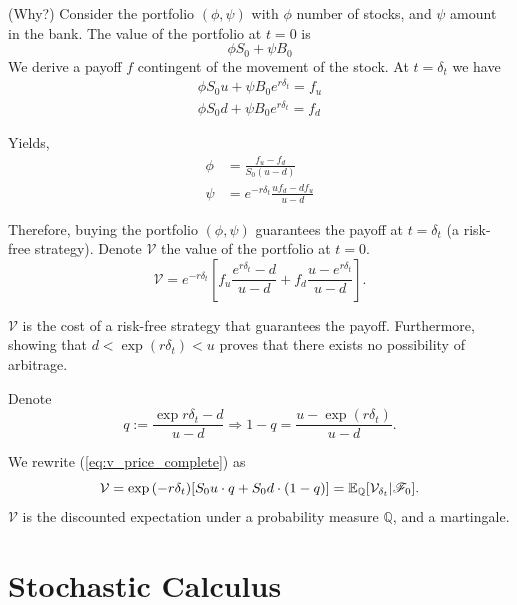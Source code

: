 \documentclass{beamer}
\begin{document}
\begin{frame}
(Why?)
Consider the portfolio $(\phi, \psi)$ with $\phi$ number of stocks, and $\psi$ amount in the bank. The value of the portfolio at $t=0$ is
\[
    \phi S_0 + \psi B_0
\]
We derive a payoff $f$ contingent of the movement of the stock. At $t=\delta_t$ we have
\begin{align*}
    \phi S_0u + \psi B_0e^{r \delta_t} = f_u\\
    \phi S_0d + \psi B_0e^{r \delta_t} = f_d
\end{align*}

Yields,
\begin{align}
	\phi &= \frac{f_u - f_d}{S_0(u-d)}\\
	\psi &= e^{-r\delta_t} \frac{uf_d - df_u}{u -d}
\end{align}
\end{frame}

\begin{frame}
Therefore, buying the portfolio $(\phi, \psi)$ guarantees the payoff at $t=\delta_t$ (a risk-free strategy). Denote $\mathcal{V}$ the value of the portfolio at $t=0$.
\begin{equation} \label{eq:v_price_complete}
	\mathcal{V} = e^{-r\delta_t}\left[f_u \frac{e^{r\delta_t} - d}{u - d} + f_d \frac{u - e^{r\delta_t}}{u-d}\right].
\end{equation}

$\mathcal{V}$ is the cost of a risk-free strategy that guarantees the payoff. Furthermore, showing that $d < \exp{(r\delta_t)} < u$ proves that there exists no possibility of arbitrage.
\end{frame}

\begin{frame}
Denote
\begin{equation}
    q:= \frac{\exp{r\delta_t} - d}{u - d} \Longrightarrow 1-q = \frac{u - \exp{(r\delta_t)}}{u-d}.
\end{equation}

We rewrite (\ref{eq:v_price_complete}) as
\begin{equation} \label{eq:v_price}
    \mathcal{V} = \exp{(-r\delta_t)}[S_0u\cdot q + S_0d \cdot (1-q)] = \mathbb{E}_{\mathbb{Q}}[\mathcal{V}_{\delta_t}|\mathscr{F}_0].
\end{equation}
$\mathcal V$ is the discounted expectation under a probability measure $\mathbb Q$, and a martingale.
\end{frame}

\section{Stochastic Calculus}
\end{document}
